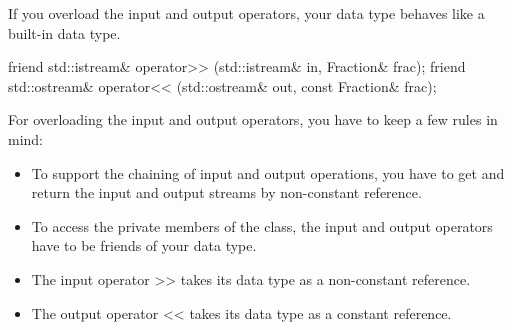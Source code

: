 
If you overload the input and output operators, your data type behaves like a built-in data type.

\begin{cpp}
friend std::istream& operator>> (std::istream& in, Fraction& frac);
friend std::ostream& operator<< (std::ostream& out, const Fraction& frac);
\end{cpp}

For overloading the input and output operators, you have to keep a few rules in mind:

\begin{itemize}
\item 
To support the chaining of input and output operations, you have to get and return the input and output streams by non-constant reference.

\item 
To access the private members of the class, the input and output operators have to be friends of your data type.
 
\item 
The input operator >{}> takes its data type as a non-constant reference.

\item 
The output operator <{}< takes its data type as a constant reference.
\end{itemize}


